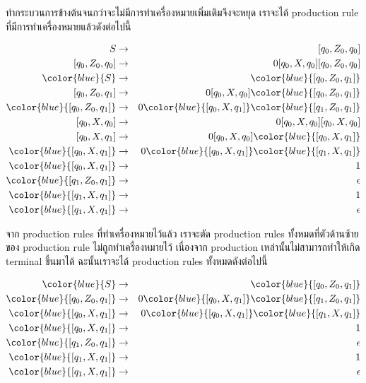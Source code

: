\par{
ทำกระบวนการข้างต้นจนกว่าจะไม่มีการทำเครื่องหมายเพิ่มเติมจึงจะหยุด เราจะได้ production rule ที่มีการทำเครื่องหมายแล้วดังต่อไปนี้

\begin{eqnarray*}
S & \rightarrow & [q_0,Z_0, q_0] \\
\left[q_0, Z_0, q_0\right] & \rightarrow & 0 [ q_0, X, q_0][q_0, Z_0, q_0] \\
%
\color{blue}{S} & \rightarrow & \color{blue}{[q_0,Z_0, q_1]} \\
\left[q_0, Z_0, q_1\right] & \rightarrow & 0 [ q_0, X, q_0]\color{blue}{[q_0, Z_0, q_1]} \\
\color{blue}{\left[q_0, Z_0, q_1\right]} & \rightarrow & 0 \color{blue}{[ q_0, X, q_1]}\color{blue}{[q_1, Z_0, q_1]} \\
%
\left[q_0, X, q_0\right] & \rightarrow & 0[q_0, X, q_0][q_0, X, q_0] \\
\left[q_0, X, q_1\right] & \rightarrow & 0[q_0, X, q_0]\color{blue}{[q_0, X, q_1]} \\
\color{blue}{\left[q_0, X, q_1\right]} & \rightarrow & 0\color{blue}{[q_0, X, q_1]}\color{blue}{[q_1, X, q_1]} \\
%
\color{blue}{\left[q_0, X, q_1\right]} & \rightarrow & 1 \\
\color{blue}{\left[q_1, Z_0, q_1\right]} & \rightarrow & \epsilon \\
\color{blue}{\left[q_1, X, q_1\right]} & \rightarrow & 1 \\
\color{blue}{\left[q_1, X, q_1\right]} & \rightarrow & \epsilon 
\end{eqnarray*}
}

\par{
จาก production rules ที่ทำเครื่องหมายไว้แล้ว เราจะตัด production rules ทั้งหมดที่ตัวด้านซ้ายของ production rule ไม่ถูกทำเครื่องหมายไว้ เนื่องจาก production เหล่านั้นไม่สามารถทำให้เกิด terminal ขึ้นมาได้ ฉะนั้นเราจะได้ production rules ทั้งหมดดังต่อไปนี้

\begin{eqnarray*}
\color{blue}{S} & \rightarrow & \color{blue}{[q_0,Z_0, q_1]} \\
\color{blue}{\left[q_0, Z_0, q_1\right]} & \rightarrow & 0 \color{blue}{[ q_0, X, q_1]}\color{blue}{[q_1, Z_0, q_1]} \\
%
\color{blue}{\left[q_0, X, q_1\right]} & \rightarrow & 0\color{blue}{[q_0, X, q_1]}\color{blue}{[q_1, X, q_1]} \\
%
\color{blue}{\left[q_0, X, q_1\right]} & \rightarrow & 1 \\
\color{blue}{\left[q_1, Z_0, q_1\right]} & \rightarrow & \epsilon \\
\color{blue}{\left[q_1, X, q_1\right]} & \rightarrow & 1 \\
\color{blue}{\left[q_1, X, q_1\right]} & \rightarrow & \epsilon \\
\end{eqnarray*}
}

